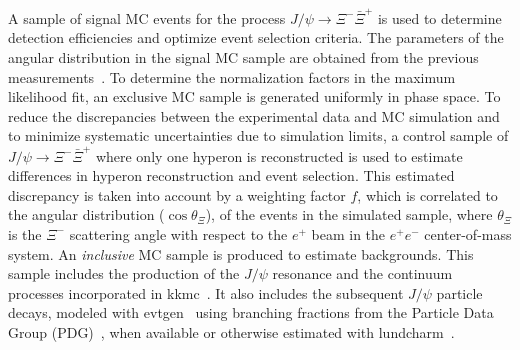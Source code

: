 \documentclass[aps,amsmath,amssymb,reprint]{revtex4-2}
\newcommand{\XXb}{\Xi^{-}\bar{\Xi}^{+}}
\newcommand{\jpsi}{J/\psi}
\begin{document}
A sample of signal MC events for the process $\jpsi\to\XXb$ is used to determine detection efficiencies and optimize event selection criteria. The parameters of the angular distribution in the signal MC sample are obtained from the previous measurements~\cite{BESIII:2021ypr}.
To determine the normalization factors in the maximum likelihood fit, an exclusive MC sample is generated uniformly in phase space.
To reduce the discrepancies between the experimental data and MC simulation and to minimize systematic uncertainties due to simulation limits, a control sample of $\jpsi\to\XXb$ where only one hyperon is reconstructed is used to estimate differences in hyperon reconstruction and event selection.
This estimated discrepancy is taken into account by a weighting factor $f$, which is correlated to the angular distribution ($\cos\theta_\Xi$), of the events in the simulated sample, where $\theta_\Xi$ is the $\Xi^-$ scattering angle with respect to the $e^+$ beam in the $e^+e^-$ center-of-mass system.
An \textit{inclusive} MC sample is produced to estimate backgrounds. This sample includes the production of the $J/\psi$
resonance and the continuum processes incorporated in {\sc
kkmc}~\cite{Jadach:2000ir}. It also includes the subsequent $J/\psi$ particle decays, modeled with {\sc
evtgen}~\cite{Ping:2008zz} using branching fractions from the
Particle Data Group (PDG)~\cite{ParticleDataGroup:2024cfk}, when available
or otherwise estimated with {\sc lundcharm}~\cite{Chen:2000tv}.
\end{document}
